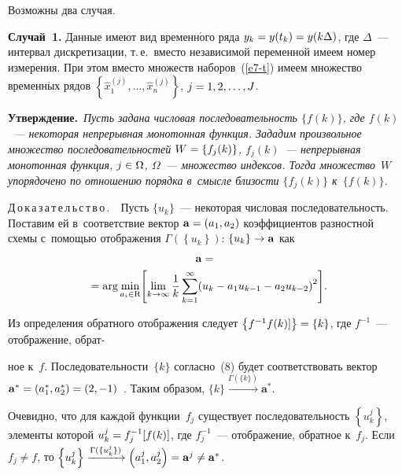 \begin{multicols}{2}
  Возможны два случая.
  
  \smallskip
  
  \noindent
  \textbf{Случай~1.} Данные имеют вид временн$\acute{\mbox{о}}$го ряда $y_k\hm= y(t_k) 
\hm= y(k\Delta)$, где $\Delta$~--- интервал дискретизации, т.\,е.\ вместо 
независимой переменной имеем номер измерения.
  При этом вместо множеств наборов~(\ref{e7-t}) имеем множество временн$\acute{\mbox{ы}}$х рядов
$\left\{ \hat{x}_1^{(j)},\ldots , \hat{x}_n^{(j)}\right\}$, $j\hm= 1,2,\ldots ,J$.

  \smallskip
  
  \noindent
  \textbf{Утверждение.}\ \textit{Пусть задана числовая последовательность 
$\{f(k)\}$, где $f(k)$~--- некоторая непрерывная монотонная функция. Зададим 
произвольное мно\-же\-ст\-во последовательностей $W\hm=\{f_j(k)\}$, $f_j(k)$~--- 
непрерывная монотонная функция, $j\hm\in \Omega$, $\Omega$~--- множество 
индексов. Тогда множество~$W$ упорядочено по отношению порядка в~смысле 
близости $\{f_j(k)\}$ к~$\{f(k)\}$.}
  
  \smallskip
  
  \noindent
  Д\,о\,к\,а\,з\,а\,т\,е\,л\,ь\,с\,т\,в\,о\,.\ \ Пусть $\{u_k\}$~--- некоторая чис\-ло\-вая 
последовательность. Поставим ей в~соответствие вектор $\mathbf{a}\hm= (a_1, 
a_2)$ коэффициентов разностной схемы с~помощью отображения $\Gamma 
\left( \left\{ u_k\right\}\right)$: $\left\{ u_k\right\} \hm\to \mathbf{a}$ как
  \begin{multline}
  \mathbf{a} ={}\\
\hspace*{-1.4mm}{}= \mathrm{arg}\min\limits_{a_i\in\mathrm{R}} \!\left[ 
\lim\limits_{k\to \infty} \fr{1}{k}\sum\limits_{k=1}^\infty \!\left( u_k -a_1u_{k-1} -
a_2 u_{k-2}\right)^2\right]\!.\!\!\!\!
  \label{e8-t}
  \end{multline}
  
  Из определения обратного отображения следует $\left\{ f^{-1} f(k)]\right\} 
\hm=\{k\}$, где $f^{-1}$~--- отображение, обрат-\linebreak\vspace*{-12pt}

\columnbreak

\noindent
ное к~$f$. 
Последовательности~$\{ k\}$ согласно~(8) будет соответствовать вектор 
$\mathbf{a}^*\hm= (a_1^*, a_2^*) = (2, -1)$~\cite{5-t}. Таким образом, $\{k\} 
\xrightarrow{\Gamma(\{k\})} \mathbf{a}^*$.
  
  Очевидно, что для каждой функции~$f_j$ существует последовательность 
$\left\{ u_k^j\right\}$, элементы которой $u_k^j\hm= f_j^{-1} [f(k)]$, где $f_j^{-
1}$~--- отображение, обратное к~$f_j$. Если $f_j\not= f$, то $\left\{ u_k^j\right\} 
\xrightarrow{\Gamma(\{u_k^j\})} \left( a_1^j, a_2^j\right) \hm= \mathbf{a}^j\not= 
\mathbf{a}^*$.
  

\end{multicols}
